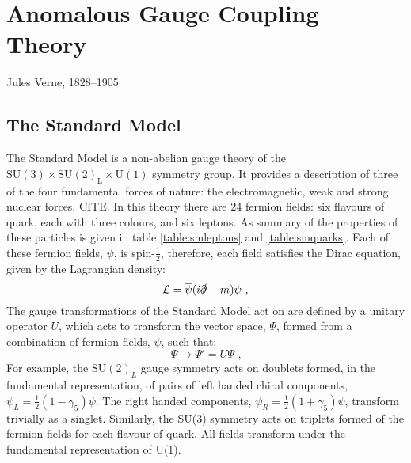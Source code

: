 \chapter{Anomalous Gauge Coupling Theory}
\label{chap:anomalousgaugecouplingtheory}

{Jules Verne, 1828--1905}


\section{The Standard Model}
The Standard Model is a non-abelian gauge theory of the $\text{SU}(3) \times \text{SU}(2)_{\text{L}} \times \text{U}(1)$ symmetry group.  It provides a description of three of the four fundamental forces of nature: the electromagnetic, weak and strong nuclear forces.  CITE.  In this theory there are 24 fermion fields: six flavours of quark, each with three colours, and six leptons.  As summary of the properties of these particles is given in table \ref{table:smleptons} and \ref{table:smquarks}.  Each of these fermion fields, $\psi$, is spin-$\frac{1}{2}$, therefore, each field satisfies the Dirac equation, given by the Lagrangian density:
%
\begin{equation}
\mathcal{L} = \overline{\psi}(i \slashed{\partial} - m)\psi \text{ ,}
\end{equation}
%
\noindent The gauge transformations of the Standard Model act on are defined by a unitary operator $U$, which acts to transform the vector space, $\Psi$, formed from a combination of fermion fields, $\psi$, such that:
%
\begin{equation}
\Psi \rightarrow \Psi' = U\Psi \text{ ,}
\end{equation}
%
For example, the $\text{SU}(2)_{L}$ gauge symmetry acts on doublets formed, in the fundamental representation, of pairs of left handed chiral components, $\psi_{L} = \frac{1}{2}(1-\gamma_{5})\psi$.  The right handed components, $\psi_{R} = \frac{1}{2}(1+\gamma_{5})\psi$, transform trivially as a singlet.  Similarly, the SU(3) symmetry acts on triplets formed of the fermion fields for each flavour of quark.  All fields transform under the fundamental representation of U(1).

